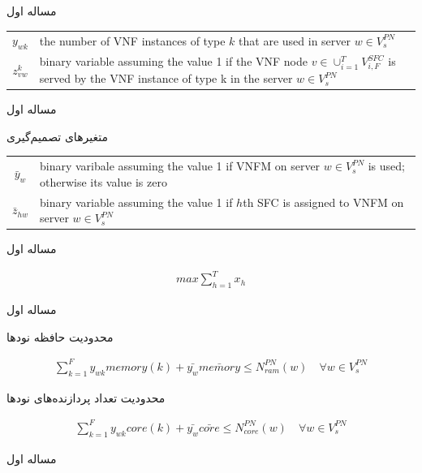 \documentclass{beamer}
\begin{document}
\begin{persian}
\begin{frame}{مساله اول}
\begin{latin}
\begin{tabular}{c p{10cm}}
		$y_{wk}$ & the number of VNF instances of type $k$ that are used in server $w \in V_s^{PN}$ \\
		$z^k_{vw}$ & binary variable assuming the value 1 if the VNF node $v \in \cup_{i=1}^{T} V_{i, F}^{SFC}$ is served by the VNF instance of type k in the server $w \in V_s^{PN}$ \\
	\end{tabular}\end{latin}
\end{frame}
\begin{frame}{مساله اول}
	\par
	متغیرهای تصمیم‌گیری
	\begin{latin}\begin{tabular}{c p{10cm}}
		$\bar{y}_w$ & binary varibale assuming the value 1 if VNFM on server $w \in V_s^{PN}$ is used; otherwise its value is zero\\
		$\bar{z}_{hw}$ & binary variable assuming the value 1 if $h$th SFC is assigned to VNFM on server $w \in V_s^{PN}$\\
	\end{tabular}\end{latin}
\end{frame}
\begin{frame}{مساله اول}
	\begin{latin}\begin{align}
	max \sum_{h=1}^Tx_h
	\end{align}\end{latin}
\end{frame}
\begin{frame}{مساله اول}
	\par
	محدودیت حافظه نودها
	\begin{latin}\begin{align}
	\sum_{k=1}^Fy_{wk} memory(k) + \bar{y_w} \bar{memory} \le N_{ram}^{PN}(w)
	\quad
	\forall w \in V_s^{PN}
	\end{align}\end{latin}
	\par
	محدودیت تعداد پردازنده‌های نودها
	\begin{latin}\begin{align}
	\sum_{k=1}^Fy_{wk} core(k) + \bar{y_w} \bar{core} \le N_{core}^{PN}(w)
	\quad
	\forall w \in V_s^{PN}
	\end{align}\end{latin}
\end{frame}
\begin{frame}{مساله اول}
	\par

\end{frame}
\end{persian}
\end{document}
